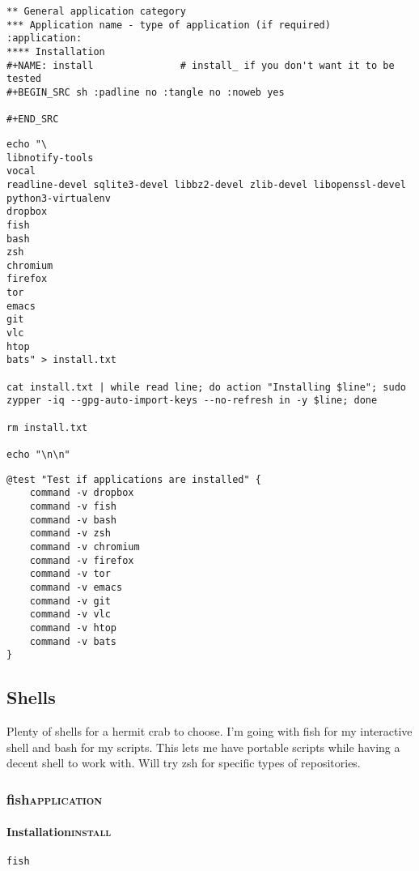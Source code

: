 \documentclass[11pt]{article}
\begin{document}
\begin{verbatim}
** General application category
*** Application name - type of application (if required)        :application:
**** Installation
#+NAME: install               # install_ if you don't want it to be tested
#+BEGIN_SRC sh :padline no :tangle no :noweb yes

#+END_SRC
\end{verbatim}

\begin{verbatim}
echo "\
libnotify-tools
vocal
readline-devel sqlite3-devel libbz2-devel zlib-devel libopenssl-devel
python3-virtualenv
dropbox
fish
bash
zsh
chromium
firefox
tor
emacs
git
vlc
htop
bats" > install.txt

cat install.txt | while read line; do action "Installing $line"; sudo zypper -iq --gpg-auto-import-keys --no-refresh in -y $line; done

rm install.txt

echo "\n\n"
\end{verbatim}

\begin{verbatim}
@test "Test if applications are installed" {
    command -v dropbox
    command -v fish
    command -v bash
    command -v zsh
    command -v chromium
    command -v firefox
    command -v tor
    command -v emacs
    command -v git
    command -v vlc
    command -v htop
    command -v bats
}
\end{verbatim}

\subsection{Shells}
\label{sec:orgce4edff}
Plenty of shells for a hermit crab to choose. I'm going with fish for my interactive shell and bash for my scripts. This lets me have portable scripts while having a decent shell to work with. Will try zsh for specific types of repositories.
\subsubsection{fish\hfill{}\textsc{application}}
\label{sec:org301bb3a}
\paragraph{Installation\hfill{}\textsc{install}}
\label{sec:org664c2a2}
\begin{verbatim}
fish
\end{verbatim}
\end{document}
